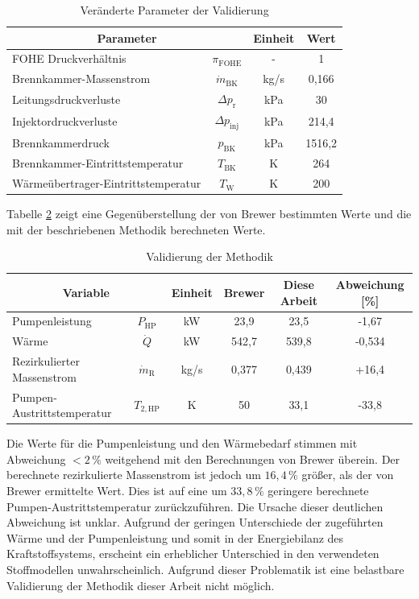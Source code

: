 \begin{table}[ht]
    \centering
	\caption{Veränderte Parameter der Validierung}
	\begin{tabular} {|l|c|c|c|} \hline%
    \multicolumn{2}{|c|}{Parameter} & Einheit & Wert\\ \hline\hline%
    FOHE Druckverhältnis & $\pi_\mathrm{FOHE}$ & - & 1 \\ \hline
    Brennkammer-Massenstrom & $\dot{m}_\mathrm{BK}$ & kg/s & 0,166 \\ \hline
    Leitungsdruckverluste & $\Delta p_\mathrm{r}$ & kPa & 30 \\ \hline
    Injektordruckverluste & $\Delta p_\mathrm{inj}$ & kPa & 214,4 \\ \hline
    Brennkammerdruck & $p_\mathrm{BK}$ & kPa & 1516,2 \\ \hline
    Brennkammer-Eintrittstemperatur & $T_\mathrm{BK}$ & K & 264 \\ \hline
    Wärmeübertrager-Eintrittstemperatur & $T_\mathrm{W}$ & K & 200 \\ \hline
    \end{tabular}	
    \label{Tab:brewer}%
\end{table}
\FloatBarrier 

Tabelle \ref{Tab:validation} zeigt eine Gegenüberstellung der von Brewer bestimmten Werte und die mit der beschriebenen Methodik berechneten Werte. 

\begin{table}[ht]
    \centering
	\caption{Validierung der Methodik}
	\begin{tabular} {|l|c|c|c|c|c|} \hline%
    \multicolumn{2}{|c|}{Variable} & Einheit & Brewer \cite{Brewer.1991} & Diese Arbeit & Abweichung [\%] \\ \hline\hline%
    Pumpenleistung & $P_\mathrm{HP}$ & kW & 23,9 & 23,5 & -1,67 \\ \hline
    Wärme & $\dot{Q}$ & kW & 542,7 & 539,8 & -0,534 \\ \hline
    Rezirkulierter Massenstrom & $\dot{m}_\mathrm{R}$ & kg/s & 0,377 & 0,439 & +16,4 \\ \hline
    Pumpen-Austrittstemperatur & $T_{2,\mathrm{HP}}$ & K & 50 & 33,1 & -33,8 \\ \hline
    \end{tabular}	
    \label{Tab:validation}%
\end{table}
\FloatBarrier 

Die Werte für die Pumpenleistung und den Wärmebedarf stimmen mit Abweichung $<2\,\%$ weitgehend mit den Berechnungen von Brewer überein. Der berechnete rezirkulierte Massenstrom ist jedoch um $16,4\,\%$ größer, als der von  Brewer ermittelte Wert. Dies ist auf eine um $33,8\,\%$ geringere berechnete Pumpen-Austrittstemperatur zurückzuführen. Die Ursache dieser deutlichen Abweichung ist unklar. Aufgrund der geringen Unterschiede der zugeführten Wärme und der Pumpenleistung und somit in der Energiebilanz des Kraftstoffsystems, erscheint ein erheblicher Unterschied in den verwendeten Stoffmodellen unwahrscheinlich. Aufgrund dieser Problematik ist eine belastbare Validierung der Methodik dieser Arbeit nicht möglich.

